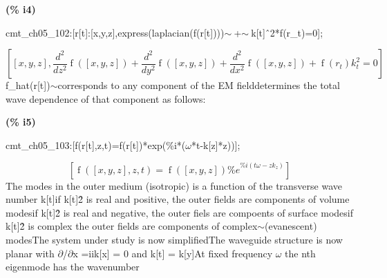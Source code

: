 \documentclass[fleqn]{article}
\begin{document}
\noindent
\begin{minipage}[t]{4.000000em}\color{red}\bfseries
(\% i4)	
\end{minipage}
\begin{minipage}[t]{\textwidth}\color{blue}
cmt\_ch05\_102:[r[t]:[x,y,z],express(laplacian(f(r[t])))\ensuremath{\sim\ }+\ensuremath{\sim\ }k[t]\^\ 2*f(r\_t)=0];
\end{minipage}
\[\displaystyle \tag{\% o4} 
\left[ \left[ x\operatorname{,}y\operatorname{,}z\right] \operatorname{,}\frac{{{d}^{2}}}{d {{z}^{2}}} \operatorname{f}\left( \left[ x\operatorname{,}y\operatorname{,}z\right] \right) +\frac{{{d}^{2}}}{d {{y}^{2}}} \operatorname{f}\left( \left[ x\operatorname{,}y\operatorname{,}z\right] \right) +\frac{{{d}^{2}}}{d {{x}^{2}}} \operatorname{f}\left( \left[ x\operatorname{,}y\operatorname{,}z\right] \right) +\operatorname{f}\left( {r_t}\right)  {{k}_{t}^{2}}=0\right] \mbox{}
\]
f\_hat(r[t])\ensuremath{\sim }corresponds to any component of the EM fielddetermines the total wave dependence of that component as follows:


\noindent
\begin{minipage}[t]{4.000000em}\color{red}\bfseries
(\% i5)	
\end{minipage}
\begin{minipage}[t]{\textwidth}\color{blue}
cmt\_ch05\_103:[f(r[t],z,t)=f(r[t])*exp(\%i*(\ensuremath{\omega}*t-k[z]*z))];
\end{minipage}
\[\displaystyle \tag{\% o5} 
\left[ \operatorname{f}\left( \left[ x\operatorname{,}y\operatorname{,}z\right] \operatorname{,}z\operatorname{,}t\right) =\operatorname{f}\left( \left[ x\operatorname{,}y\operatorname{,}z\right] \right)  {{\% e}^{\% i \left( t \omega -z {k_z}\right) }}\right] \mbox{}
\]
The modes in the outer medium (isotropic) is a function of the transverse wave number k[t]if k[t]\^ 2 is real and positive, the outer fields are components of volume modesif k[t]\^ 2 is real and negative, the outer fiels are compoents of surface modesif k[t]\^ 2 is complex the outer fields are components of complex\ensuremath{\sim }(evanescent) modesThe system under study is now simplifiedThe waveguide structure is now planar with \ensuremath{\partial}/\ensuremath{\partial}x =iik[x] = 0 and k[t] = k[y]At fixed frequency \ensuremath{\omega} the nth eigenmode has the wavenumber
\end{document}
